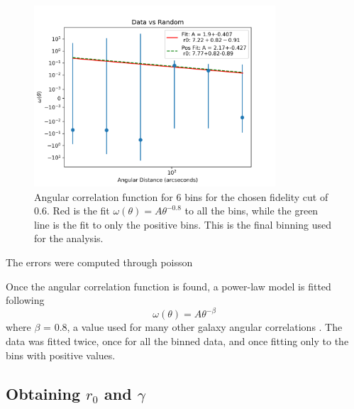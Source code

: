 \begin{figure}[!tbp]
\centering \includegraphics[width=90mm]{clustering_two/Data_vs_Random_10000_bin6_sn0_6_NFalse.png}
\caption{Angular correlation function for 6 bins for the chosen fidelity cut of 0.6. Red is the fit $\omega(\theta) = A\theta^{-0.8}$ to all the bins, while the green line is the fit to only the positive bins. This is the final binning used for the analysis. }
\label{fig:Angular_binnings}
\end{figure}


The errors were computed through poisson 


Once the angular correlation function is found, a power-law model is fitted following $$\omega(\theta) = A\theta^{-\beta} $$ where $\beta$ = 0.8, a value used for many other galaxy angular correlations \cite{hickox2011clustering}. The data was fitted twice, once for all the binned data, and once fitting only to the bins with positive values.

\subsection{Obtaining $r_0$ and $\gamma$}



